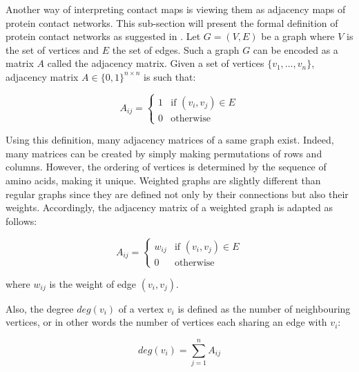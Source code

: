         Another way of interpreting contact maps is viewing them as adjacency maps of protein contact networks.
        This sub-section will present the formal definition of protein contact networks as suggested in \cite{doi:10.1021/cr3002356}.
        Let $G = (V, E)$ be a graph where $V$ is the set of vertices and $E$ the set of edges. Such a graph $G$ can be encoded as a matrix $A$ called
        the adjacency matrix. Given a set of vertices $\{ v_1, \ldots, v_n \}$, adjacency matrix $A \in \{ 0, 1 \}^{n \times n}$ is such that:

        \begin{equation}
            A_{ij} =
                \begin{cases}
                    1 & \text{if } (v_i, v_j) \in E \\
                    0 & \text{otherwise}
                \end{cases}
        \end{equation}

        Using this definition, many adjacency matrices of a same graph exist. Indeed, many matrices can be created by simply
        making permutations of rows and columns. However, the ordering of vertices is determined by the sequence
        of amino acids, making it unique.
        Weighted graphs are slightly different than regular graphs since they are defined not only by their connections but also their weights.
        Accordingly, the adjacency matrix of a weighted graph is adapted as follows:

        \begin{equation}
            A_{ij} =
                \begin{cases}
                    w_{ij} & \text{if } (v_i, v_j) \in E \\
                    0 & \text{otherwise}
                \end{cases}
        \end{equation}

        where $w_{ij}$ is the weight of edge $(v_i, v_j)$.

        Also, the degree $deg(v_i)$ of a vertex $v_i$ is defined as the number of neighbouring vertices, or in other
        words the number of vertices each sharing an edge with $v_i$:

        \begin{equation}
            deg(v_i) = \sum\limits_{j=1}^{n} A_{ij}
        \end{equation}


